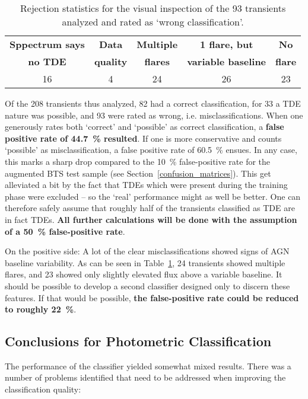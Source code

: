 \begin{table}
  \centering
  \def\arraystretch{1.2}
  \begin{tabular}{c c  c  c c}
    \hline
    \textbf{Sppectrum says} & \textbf{Data}    & \textbf{Multiple} & \textbf{1 flare, but}      & \textbf{No}    \\
    \textbf{no TDE}         & \textbf{quality} & \textbf{flares}   & \textbf{variable baseline} & \textbf{flare} \\
    \hline
    \hline
    16                      & 4                & 24                & 26                         & 23             \\
    \hline
  \end{tabular}
  \caption[Visual inspection: rejection statistics]{Rejection statistics for the visual inspection of the 93 transients analyzed and rated as `wrong classification'.}
  \label{tab:rejection_statistics}
\end{table}

Of the 208 transients thus analyzed, 82 had a correct classification, for 33 a TDE nature was possible, and 93 were rated as wrong, i.e. misclassifications. When one generously rates both `correct' and `possible' as correct classification, a \textbf{false positive rate of \SI{44.7}{\percent} resulted}. If one is more conservative and counts `possible' as misclassification, a false positive rate of \SI{60.5}{\percent} ensues. In any case, this marks a sharp drop compared to the \SI{10}{\percent} false-positive rate for the augmented BTS test sample (see Section~\ref{confusion_matrices}). This get alleviated a bit by the fact that TDEs which were present during the training phase were excluded -- so the `real' performance might as well be better. One can therefore safely assume that roughly half of the transients classified as TDE are in fact TDEs. \textbf{All further calculations will be done with the assumption of a \SI{50}{\percent} false-positive rate}.

On the positive side: A lot of the clear misclassifications showed signs of AGN baseline variability. As can be seen in Table~\ref{tab:rejection_statistics}, 24 transients showed multiple flares, and 23 showed only slightly elevated flux above a variable baseline. It should be possible to develop a second classifier designed only to discern these features. If that would be possible, \textbf{the false-positive rate could be reduced to roughly \SI{22}{\percent}}.

\subsection{Conclusions for Photometric Classification}
The performance of the classifier yielded somewhat mixed results. There was a number of problems identified that need to be addressed when improving the classification quality:

